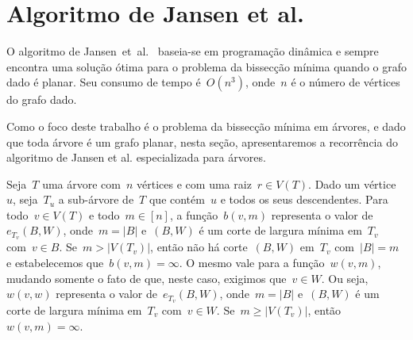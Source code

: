 \section {Algoritmo de Jansen et al.}

O algoritmo de Jansen~et~al.~\cite{JansenKLS01} baseia-se 
em programação dinâmica e sempre encontra
uma solução ótima para o problema da bissecção
mínima quando o grafo dado é planar.
Seu consumo de tempo é~$O(n^3)$, onde~$n$ é
o número de vértices do grafo dado.

Como o foco deste trabalho é o problema da 
bissecção mínima em árvores, e dado
que toda árvore é um grafo
planar, nesta seção, apresentaremos a 
recorrência do algoritmo de Jansen et al.
especializada para árvores. 

\bigskip
\bigskip


Seja~$T$ uma árvore com~$n$ vértices e com uma raiz~${r\in V(T)}$.
Dado um vértice~$u$, seja~$T_u$ a sub-árvore de~$T$ que contém~$u$
e todos os seus descendentes. 
Para todo~${v\in V(T)}$ e todo~${m\in[n]}$,
a função~$b(v,m)$ representa o valor
de~$e_{T_v}(B,W)$, onde~${m=|B|}$
e~$(B,W)$ é um corte de largura mínima em~$T_v$ com~${v\in B}$.
Se~${m>|V(T_v)|}$, então não há corte~$(B,W)$ em~$T_v$ com~${|B|=m}$
e estabelecemos que~${b(v,m) = \infty}$.
O mesmo vale para a função~$w(v,m)$, mudando somente
o fato de que, neste caso, exigimos que~${v\in W}$.
Ou seja,~$w(v,w)$ representa o valor
de~${e_{T_v}(B,W)}$, onde~${m=|B|}$
e~$(B,W)$ é um corte de largura mínima em~$T_v$ com~${v\in W}$.
Se~${m\ge |V(T_v)|}$, então~${w(v,m) = \infty}$.

